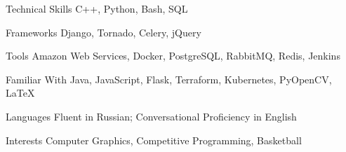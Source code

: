 

\begin{cvskills}
  \cvskill
    {Technical Skills} %
    {C++, Python, Bash, SQL} %

  \cvskill
    {Frameworks} %
    {Django, Tornado, Celery, jQuery} %

  \cvskill
    {Tools} %
    {Amazon Web Services, Docker, PostgreSQL, RabbitMQ, Redis, Jenkins} %

  \cvskill
    {Familiar With} %
    {Java, JavaScript, Flask, Terraform, Kubernetes, PyOpenCV, \LaTeX} %

  \cvskill
    {Languages} %
    {Fluent in Russian; Conversational Proficiency in English} %

  \cvskill
    {Interests} %
    {Computer Graphics, Competitive Programming, Basketball} %
    


\end{cvskills}
